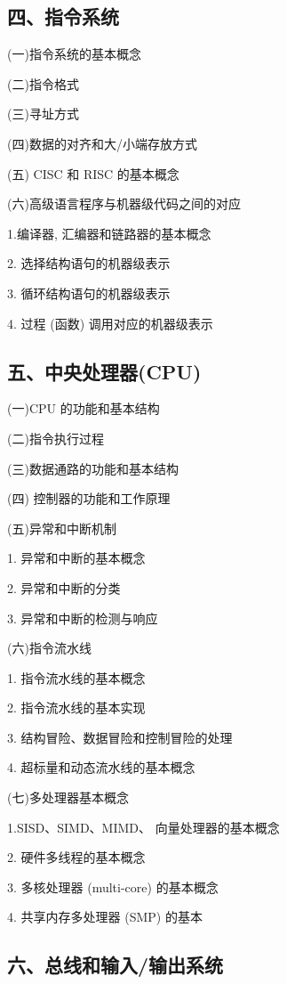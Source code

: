 \documentclass[10pt]{article}
\begin{document}
\subsection*{四、指令系统}

(一)指令系统的基本概念

(二)指令格式

(三)寻址方式

(四)数据的对齐和大/小端存放方式

(五) CISC 和 RISC 的基本概念

(六)高级语言程序与机器级代码之间的对应

1.编译器, 汇编器和链路器的基本概念

2. 选择结构语句的机器级表示

3. 循环结构语句的机器级表示

4. 过程 (函数) 调用对应的机器级表示

\subsection*{五、中央处理器(CPU)}

(一)CPU 的功能和基本结构

(二)指令执行过程

(三)数据通路的功能和基本结构

(四) 控制器的功能和工作原理

(五)异常和中断机制

1. 异常和中断的基本概念

2. 异常和中断的分类

3. 异常和中断的检测与响应

(六)指令流水线

1. 指令流水线的基本概念

2. 指令流水线的基本实现

3. 结构冒险、数据冒险和控制冒险的处理

4. 超标量和动态流水线的基本概念

(七)多处理器基本概念

1.SISD、SIMD、MIMD、 向量处理器的基本概念

2. 硬件多线程的基本概念

3. 多核处理器 (multi-core) 的基本概念

4. 共享内存多处理器 (SMP) 的基本

\subsection*{六、总线和输入/输出系统}
\end{document}
